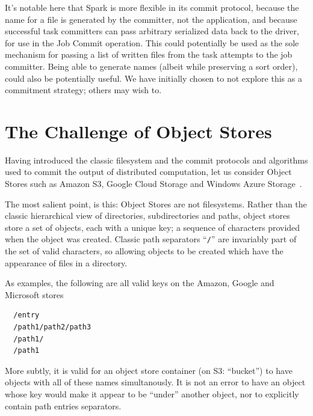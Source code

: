 \documentclass[conference]{IEEEtran}
\begin{document}
It's notable here that Spark is more flexible in its commit protocol, because
the name for a file is generated by the committer, not the application,
and because successful task committers can pass arbitrary serialized data back
to the driver, for use in the Job Commit operation.
This could potentially be used as the sole mechanism for passing a list
of written files from the task attempts to the job committer.
Being able to generate names (albeit while preserving a sort order), could
also be potentially useful.
We have initially chosen to not explore this as a commitment strategy;
others may wish to.



\section{The Challenge of Object Stores}
\label{sec:object-stores}

Having introduced the classic filesystem and the commit protocols and algorithms
used to commit the output of distributed computation, let us consider
Object Stores such as Amazon S3, Google Cloud Storage and
Windows Azure Storage\ \cite{AWS-S3-intro,Calder11}.



The most salient point, is this: Object Stores are not filesystems.
Rather than the classic hierarchical view of directories, subdirectories
and paths, object stores store a set of objects, each with a unique key;
a sequence of characters provided when the object was created.
Classic path separators ``\texttt{/}'' are invariably part of the set of valid
characters, so allowing objects to be created which have the appearance
of files in a directory.

As examples, the following are all valid keys on the Amazon, Google and Microsoft
stores

\begin{verbatim}
  /entry
  /path1/path2/path3
  /path1/
  /path1
\end{verbatim}

More subtly, it is valid for an object store container (on S3: ``bucket'')
to have objects with all of these names simultanously.
It is not an error to have an object whose key would make it appear to be
``under'' another object, nor to explicitly contain path entries separators.
\end{document}
